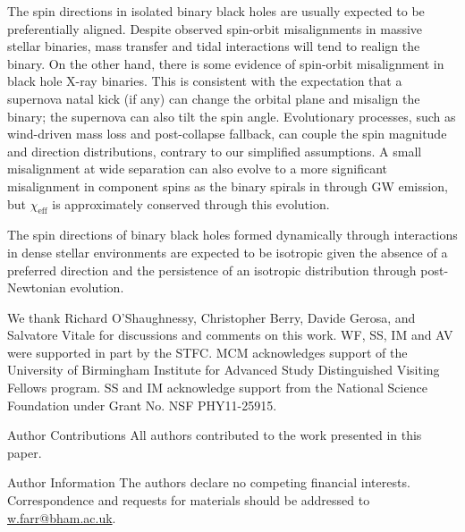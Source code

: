 \documentclass{nature}
\newcommand{\chieff}{\chi_\mathrm{eff}}
\begin{document}
The spin directions in isolated binary black
holes\cite{TutukovYungelson:1993,Lipunov:1997,2016Natur.534..512B,Stevenson:2017,MandeldeMink:2016,Marchant:2016}
are usually expected to be preferentially aligned.  Despite observed
spin-orbit misalignments in massive stellar
binaries\cite{Albrecht:2009}, mass transfer and tidal interactions
will tend to realign the binary.  On the other hand, there is some
evidence of spin-orbit misalignment in black hole X-ray
binaries\cite{Orosz:2001,Martin:2008b,MorningstarMiller:2014}.  This
is consistent with the expectation that a supernova natal kick (if
any) can change the orbital plane and misalign the
binary\cite{2000ApJ...541..319K}; the supernova can also tilt the spin
angle\cite{2011ApJ...742...81F}.  Evolutionary processes, such as
wind-driven mass loss and post-collapse fallback, can couple the spin
magnitude and direction distributions, contrary to our simplified
assumptions.  A small misalignment at wide separation can also evolve
to a more significant misalignment in component spins as the binary
spirals in through \ac{GW} emission\cite{2015PhRvD..92f4016G}, but
$\chieff$ is approximately conserved through this evolution.

The spin directions of binary black holes formed dynamically through
interactions in dense stellar
environments\cite{SigurdssonHernquist:1993,1993Natur.364..421K,PZMcMillan:2000,Rodriguez:2015,Stone:2016}
are expected to be isotropic given the absence of a preferred
direction\cite{2016ApJ...832L...2R} and the persistence of an
isotropic distribution through post-Newtonian
evolution\cite{2004PhRvD..70l4020S,2007ApJ...661L.147B}.

\begin{addendum}
\item We thank Richard O'Shaughnessy, Christopher Berry, Davide
  Gerosa, and Salvatore Vitale for discussions and comments on this
  work.  WF, SS, IM and AV were supported in part by the STFC.  MCM
  acknowledges support of the University of Birmingham Institute for
  Advanced Study Distinguished Visiting Fellows program.  SS and IM
  acknowledge support from the National Science Foundation under Grant
  No. NSF PHY11-25915.
\item[Author Contributions] All authors contributed to the work
  presented in this paper.
\item[Author Information] %
  The authors declare no competing financial interests.
  Correspondence and requests for materials should be addressed to
  \href{mailto:w.farr@bham.ac.uk}{w.farr@bham.ac.uk}.
\end{addendum}
\end{document}
